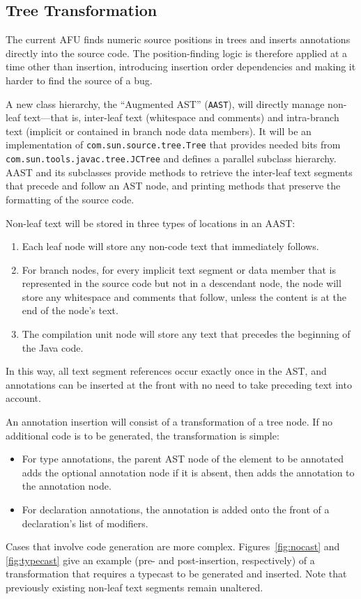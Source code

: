 \documentclass{article}
\begin{document}
\subsection{Tree Transformation}

The current AFU finds numeric source positions in trees and inserts
annotations directly into the source code.  The position-finding logic
is therefore applied at a time other than insertion, introducing
insertion order dependencies and making it harder to find the source of
a bug.

A new class hierarchy, the ``Augmented AST'' (\texttt{AAST}), will
directly manage non-leaf text---that is, inter-leaf text (whitespace and
comments) and intra-branch text (implicit or contained in branch node
data members).  It will be an implementation of
\texttt{com.sun.source.tree.Tree} that provides needed bits from
\texttt{com.sun.tools.javac.tree.JCTree} and defines a parallel subclass
hierarchy.  AAST and its subclasses provide methods to retrieve the
inter-leaf text segments that precede and follow an AST node, and
printing methods that preserve the formatting of the source code.

Non-leaf text will be stored in three types of locations in an AAST:
\begin{enumerate}
\item  Each leaf node will store any non-code text that immediately
follows.
\item  For branch nodes, for every implicit text segment or data member
that is represented in the source code but not in a descendant node, the
node will store any whitespace and comments that follow, unless the
content is at the end of the node's text.
\item  The compilation unit node will store any text that precedes the
beginning of the Java code.
\end{enumerate}
In this way, all text segment references occur exactly once in the AST,
and annotations can be inserted at the front with no need to take
preceding text into account.

An annotation insertion will consist of a transformation of a tree node.
If no additional code is to be generated, the transformation is simple:
\begin{itemize}
\item  For type annotations, the parent AST node of the element to be
annotated adds the optional annotation node if it is absent, then adds
the annotation to the annotation node.
\item  For declaration annotations, the annotation is added onto the
front of a declaration's list of modifiers.
\end{itemize}
Cases that involve code generation are more complex.
Figures~\ref{fig:nocast} and \ref{fig:typecast} give an example (pre-
and post-insertion, respectively) of a transformation that requires a
typecast to be generated and inserted.  Note that previously existing
non-leaf text segments remain unaltered.
\end{document}
